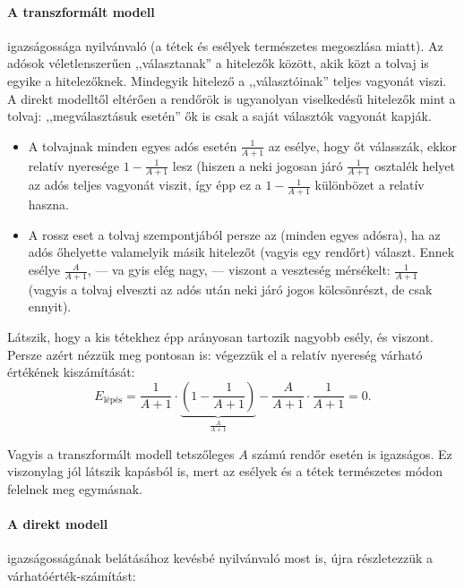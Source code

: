 \documentclass{article}
\newcommand{\parenthesed}[1]{\left(#1\right)}
\begin{document}
	\paragraph{A transzformált modell} igazságossága nyilvánvaló (a tétek és esélyek természetes megoszlása miatt). Az adósok véletlenszerűen ,,választanak'' a hitelezők között, akik közt a tolvaj is egyike a hitelezőknek. Mindegyik hitelező a ,,választóinak'' teljes vagyonát viszi. A direkt modelltől eltérően a rendőrök is ugyanolyan viselkedésű hitelezők mint a tolvaj: ,,megválasztásuk esetén'' ők is csak a saját választók vagyonát kapják.
	\begin{itemize}
		\item A tolvajnak minden egyes adós esetén $\frac1{A+1}$ az esélye, hogy őt válasszák, ekkor relatív nyeresége $1 - \frac{1}{A+1}$ lesz (hiszen a neki jogosan járó $\frac{1}{A+1}$ osztalék helyet az adós teljes vagyonát viszit, így épp ez a $1 - \frac{1}{A+1}$ különbözet a relatív haszna.
		\item A rossz eset a tolvaj szempontjából persze az (minden egyes adósra), ha az adós őhelyette valamelyik másik hitelezőt (vagyis egy rendőrt) választ. Ennek esélye $\frac A{A+1}$, --- va gyis elég nagy, --- viszont a veszteség mérsékelt: $\frac1{A+1}$ (vagyis a tolvaj elveszti az adós után neki járó jogos kölcsönrészt, de csak ennyit).
	\end{itemize}

	Látszik, hogy a kis tétekhez épp arányosan tartozik nagyobb esély, és viszont. Persze azért nézzük meg pontosan is: végezzük el a relatív nyereség várható értékének kiszámítását:
	\[E_{\text{lépés}} = \frac1{A+1}\cdot\underbrace{\parenthesed{1 - \frac{1}{A+1}}}_{\frac A{A+1}} - \frac A{A+1}\cdot\frac1{A+1} = 0.\]

	Vagyis a transzformált modell tetszőleges $A$ számú rendőr esetén is igazságos. Ez viszonylag jól látszik kapásból is, mert az esélyek és a tétek természetes módon felelnek meg egymásnak.

	\paragraph{A direkt modell} igazságosságának belátásához kevésbé nyilvánvaló most is, újra részletezzük a  várhatóérték-számítást:
	
\end{document}
